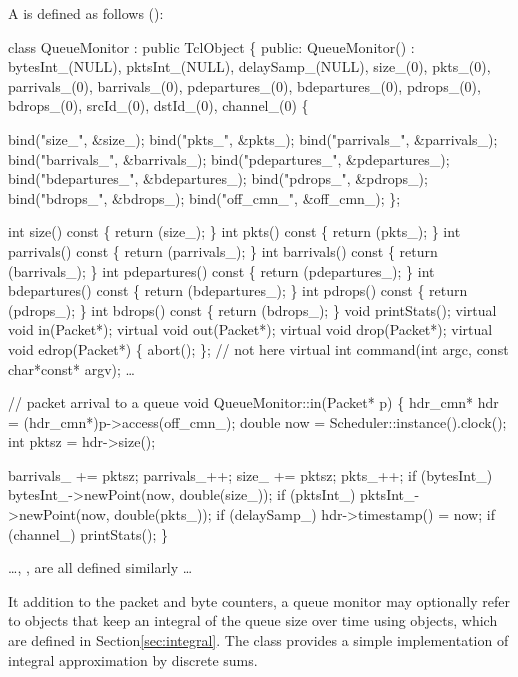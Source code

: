 A  is defined as follows ():
\begin{program}
        class QueueMonitor : public TclObject \{
         public: 
                QueueMonitor() : bytesInt_(NULL), pktsInt_(NULL), delaySamp_(NULL),
                  size_(0), pkts_(0),
                  parrivals_(0), barrivals_(0),
                  pdepartures_(0), bdepartures_(0),
                  pdrops_(0), bdrops_(0),
                  srcId_(0), dstId_(0), channel_(0) \{

                        bind("size_", &size_);
                        bind("pkts_", &pkts_);
                        bind("parrivals_", &parrivals_);
                        bind("barrivals_", &barrivals_);
                        bind("pdepartures_", &pdepartures_);
                        bind("bdepartures_", &bdepartures_);
                        bind("pdrops_", &pdrops_);
                        bind("bdrops_", &bdrops_);
                        bind("off_cmn_", &off_cmn_);
                \};

                int size() const \{ return (size_); \}
                int pkts() const \{ return (pkts_); \}
                int parrivals() const \{ return (parrivals_); \}
                int barrivals() const \{ return (barrivals_); \}
                int pdepartures() const \{ return (pdepartures_); \}
                int bdepartures() const \{ return (bdepartures_); \}
                int pdrops() const \{ return (pdrops_); \}
                int bdrops() const \{ return (bdrops_); \}
                void printStats();
                virtual void in(Packet*);
                virtual void out(Packet*);
                virtual void drop(Packet*);
                virtual void edrop(Packet*) \{ abort(); \}; // not here
                virtual int command(int argc, const char*const* argv);
                \ldots

        // {\cf packet arrival to a queue}
        void QueueMonitor::in(Packet* p)
        \{
                hdr_cmn* hdr = (hdr_cmn*)p->access(off_cmn_);
                double now = Scheduler::instance().clock();
                int pktsz = hdr->size();

                barrivals_ += pktsz;
                parrivals_++;
                size_ += pktsz;
                pkts_++;
                if (bytesInt_)
                        bytesInt_->newPoint(now, double(size_));
                if (pktsInt_)
                        pktsInt_->newPoint(now, double(pkts_));
                if (delaySamp_)
                        hdr->timestamp() = now;
                if (channel_)
                        printStats();
        \}

        \ldots {}, ,  are all defined similarly \ldots
\end{program}
It addition to the packet and byte counters, a queue monitor
may optionally refer to objects that keep an integral
of the queue size over time using
 objects, which are defined in Section\ref{sec:integral}.
The  class provides a simple implementation of
integral approximation by discrete sums.

